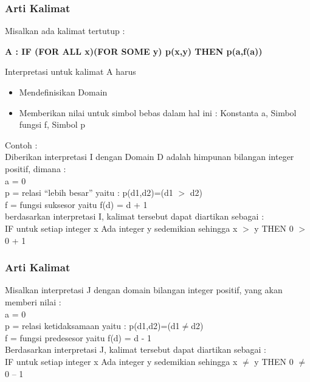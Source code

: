 \documentclass[handout]{beamer}
\theoremstyle{definition}
\theoremstyle{example}
\begin{document}
\begin{frame}
	\frametitle{Arti Kalimat}
	Misalkan ada kalimat tertutup :\\
	\begin{center}
		\textbf{A : IF (FOR ALL x)(FOR SOME y) p(x,y) THEN p(a,f(a))}
	\end{center}
	Interpretasi untuk kalimat A harus\\
	\begin{itemize}
		\item Mendefinisikan Domain
		\item Memberikan nilai untuk simbol bebas dalam hal ini : Konstanta a, Simbol fungsi f, Simbol p
	\end{itemize}
	Contoh :\\
	 Diberikan interpretasi I dengan Domain D adalah himpunan bilangan integer positif, dimana :\\
	 a = 0\\
	 p = relasi “lebih besar” yaitu : p(d1,d2)=(d1 $>$ d2)\\
	 f  = fungsi suksesor yaitu f(d) = d + 1\\
	 berdasarkan interpretasi I, kalimat tersebut dapat diartikan sebagai :\\
	 IF untuk setiap integer x Ada integer y sedemikian sehingga x $>$ y  THEN 0 $>$ 0 + 1
		
\end{frame}

\begin{frame}
	\frametitle{Arti Kalimat}
	Misalkan interpretasi J dengan domain bilangan integer positif, yang akan memberi nilai :\\
	a = 0\\
	p = relasi ketidaksamaan yaitu : p(d1,d2)=(d1$\neq$d2)\\
	f  = fungsi predesesor yaitu f(d) = d - 1\\
	Berdasarkan interpretasi J, kalimat tersebut dapat diartikan sebagai :\\
	IF untuk setiap integer x Ada integer y sedemikian sehingga  x $\neq$ y  THEN 0 $\neq$ 0 – 1
\end{frame}
\end{document}
